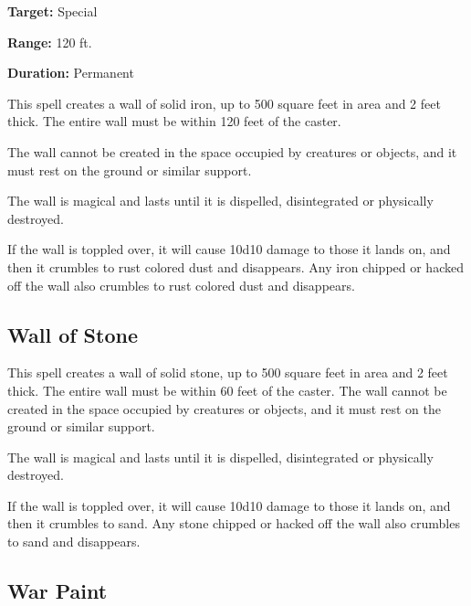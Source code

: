 \begin{multicols*}{2}
{\textbf{Target:} Special

\textbf{Range:} 120 ft.

\textbf{Duration:} Permanent}

This spell creates a wall of solid iron, up to 500 square feet in area and 2 feet thick. The entire wall must be within 120 feet of the caster.

The wall cannot be created in the space occupied by creatures or objects, and it must rest on the ground or similar support.

The wall is magical and lasts until it is dispelled, disintegrated or physically destroyed.

If the wall is toppled over, it will cause 10d10 damage to those it lands on, and then it crumbles to rust colored dust and disappears. Any iron chipped or hacked off the wall also crumbles to rust colored dust and disappears.

\subsection{Wall of Stone}\label{spell:Wall of Stone}

This spell creates a wall of solid stone, up to 500 square feet in area and 2 feet thick. The entire wall must be within 60 feet of the caster. The wall cannot be created in the space occupied by creatures or objects, and it must rest on the ground or similar support.

The wall is magical and lasts until it is dispelled, disintegrated or physically destroyed.

If the wall is toppled over, it will cause 10d10 damage to those it lands on, and then it crumbles to sand. Any stone chipped or hacked off the wall also crumbles to sand and disappears.

\subsection{War Paint}\label{spell:War Paint}



\end{multicols*}
